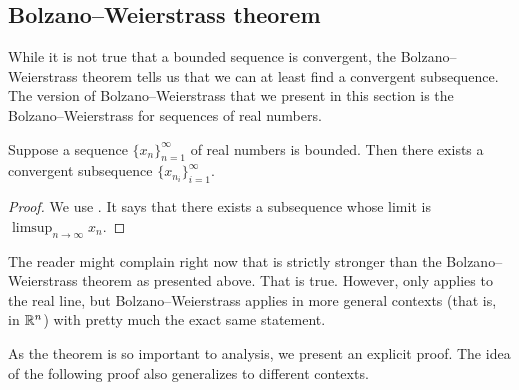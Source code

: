 \subsection{Bolzano--Weierstrass theorem}

While it is not true that a bounded sequence is convergent, the
Bolzano--Weierstrass theorem tells us that we can at least find a convergent
subsequence.
The version of Bolzano--Weierstrass 
that we present in this section is the Bolzano--Weierstrass for
sequences of real numbers.

\begin{thm}\label{thm:bwseq}
Suppose a sequence $\{ x_n \}_{n=1}^\infty$ of real numbers is bounded.
Then there exists a convergent subsequence $\{ x_{n_i} \}_{i=1}^\infty$.
\end{thm}

\begin{proof}
We use .  It says that there exists
a subsequence whose limit is $\limsup_{n\to\infty} x_n$.
\end{proof}

The reader might complain right now that 
 is strictly stronger than the
Bolzano--Weierstrass theorem as presented above.  That is true.
However, 
 only applies to the real line, but
Bolzano--Weierstrass applies in more general contexts (that is, in ${\mathbb{R}}^n$)
with pretty much the exact same statement.

As the theorem is so important to analysis, we present an explicit
proof.
The idea of the following proof also generalizes to different contexts.

